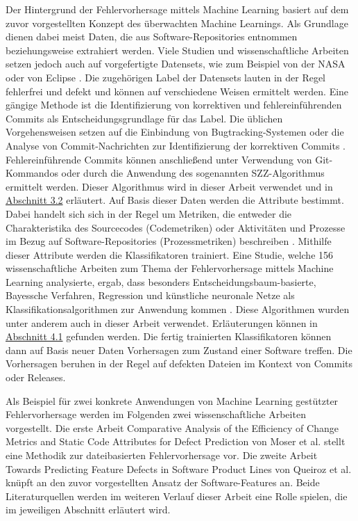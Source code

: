 Der Hintergrund der Fehlervorhersage mittels Machine Learning basiert auf dem zuvor vorgestellten Konzept des überwachten Machine Learnings. Als Grundlage dienen dabei meist Daten, die aus Software-Repositories entnommen beziehungsweise extrahiert werden. Viele Studien und wissenschaftliche Arbeiten setzen jedoch auch auf vorgefertigte Datensets, wie zum Beispiel von der NASA oder von Eclipse \cite{Son2019}. Die zugehörigen Label der Datensets lauten in der Regel \glqq fehlerfrei\grqq{} und \glqq defekt\grqq{} und können auf verschiedene Weisen ermittelt werden. Eine gängige Methode ist die Identifizierung von korrektiven und fehlereinführenden Commits als Entscheidungsgrundlage für das Label. Die üblichen Vorgehensweisen setzen auf die Einbindung von Bugtracking-Systemen oder die Analyse von Commit-Nachrichten zur Identifizierung der korrektiven Commits \cite{Queiroz2016,Zimmermann2007}. Fehlereinführende Commits können anschließend unter Verwendung von Git-Kommandos oder durch die Anwendung des sogenannten SZZ-Algorithmus ermittelt werden. Dieser Algorithmus wird in dieser Arbeit verwendet und in \hyperref[szz-def]{Abschnitt 3.2} erläutert. Auf Basis dieser Daten werden die Attribute bestimmt. Dabei handelt sich sich in der Regel um Metriken, die entweder die Charakteristika des Sourcecodes (Codemetriken) oder Aktivitäten und Prozesse im Bezug auf Software-Repositories (Prozessmetriken) beschreiben \cite{Son2019,Rahman2013}. Mithilfe dieser Attribute werden die Klassifikatoren trainiert. Eine Studie, welche 156 wissenschaftliche Arbeiten zum Thema der Fehlervorhersage mittels Machine Learning analysierte, ergab, dass besonders Entscheidungsbaum-basierte, Bayessche Verfahren, Regression und künstliche neuronale Netze als Klassifikationsalgorithmen zur Anwendung kommen \cite{Son2019}. Diese Algorithmen wurden unter anderem auch in dieser Arbeit verwendet. Erläuterungen können in \hyperref[algorithms]{Abschnitt 4.1} gefunden werden. Die fertig trainierten Klassifikatoren können dann auf Basis neuer Daten Vorhersagen zum Zustand einer Software treffen. Die Vorhersagen beruhen in der Regel auf defekten Dateien im Kontext von Commits oder Releases.

Als Beispiel für zwei konkrete Anwendungen von Machine Learning gestützter Fehlervorhersage werden im Folgenden zwei wissenschaftliche Arbeiten vorgestellt. Die erste Arbeit \glqq Comparative Analysis of the Efficiency of Change Metrics and Static Code Attributes for Defect Prediction\grqq{} von Moser et al. \cite{Moser2008} stellt eine Methodik zur dateibasierten Fehlervorhersage vor. Die zweite Arbeit \glqq Towards Predicting Feature Defects in Software Product Lines\grqq{} von Queiroz et al. \cite{Queiroz2016} knüpft an den zuvor vorgestellten Ansatz der Software-Features an. Beide Literaturquellen werden im weiteren Verlauf dieser Arbeit eine Rolle spielen, die im jeweiligen Abschnitt erläutert wird.

